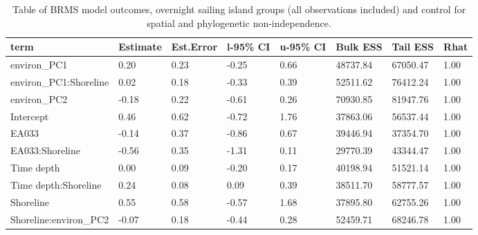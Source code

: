 \begin{table}[ht]
\centering
\begin{tabular}{p{3cm}p{1.35cm}p{1.35cm}p{1.35cm}p{1.35cm}p{1.35cm}p{1.35cm}p{1.35cm}}
  \toprule
term & Estimate & Est.Error & l-95\% CI & u-95\% CI & Bulk ESS & Tail ESS & Rhat \\ 
  \midrule
environ\_PC1 & 0.20 & 0.23 & -0.25 & 0.66 & 48737.84 & 67050.47 & 1.00 \\ 
  environ\_PC1:Shoreline & 0.02 & 0.18 & -0.33 & 0.39 & 52511.62 & 76412.24 & 1.00 \\ 
  environ\_PC2 & -0.18 & 0.22 & -0.61 & 0.26 & 70930.85 & 81947.76 & 1.00 \\ 
  Intercept & 0.46 & 0.62 & -0.72 & 1.76 & 37863.06 & 56537.44 & 1.00 \\ 
  EA033 & -0.14 & 0.37 & -0.86 & 0.67 & 39446.94 & 37354.70 & 1.00 \\ 
  EA033:Shoreline & -0.56 & 0.35 & -1.31 & 0.11 & 29770.39 & 43344.47 & 1.00 \\ 
  Time depth & 0.00 & 0.09 & -0.20 & 0.17 & 40198.94 & 51521.14 & 1.00 \\ 
  Time depth:Shoreline & 0.24 & 0.08 & 0.09 & 0.39 & 38511.70 & 58777.57 & 1.00 \\ 
  Shoreline & 0.55 & 0.58 & -0.57 & 1.68 & 37895.80 & 62755.26 & 1.00 \\ 
  Shoreline:environ\_PC2 & -0.07 & 0.18 & -0.44 & 0.28 & 52459.71 & 68246.78 & 1.00 \\ 
   \bottomrule
\end{tabular}
\caption{Table of BRMS model outcomes, overnight sailing island groups (all observations included) and control for spatial and phylogenetic non-independence.} 
\label{BRMS_effects_SBZR_control_sp}
\end{table}
